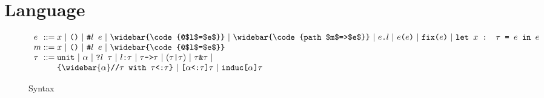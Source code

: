 \documentclass[acmsmall]{acmart}
\begin{document}

\section{Language}

\begin{figure*}[h]
\[
  \begin{array}{l @{} l}
    e 
    &{} ::=
    \begin{array}[t]{@{} l}
      \code{$x$}
      \ |\ 
      \code{()}
      \ |\ 
      \code{\#$l$ $e$} 
      \ |\ 
      \widebar{\code{@$l$=$e$}}
      \ |\ 
      \widebar{\code{path $m$=>$e$}} 
      \ |\ 
      \code{$e$.$l$}
      \ |\ 
      \code{$e$($e$)} 
      \ |\ 
      \code{fix($e$)}
      \ |\ 
      \code{let $x$ : $\tau$ = $e$ in $e$}
    \end{array}
    \\
    m 
    &{} ::=
    \begin{array}[t]{@{} l}
      \code{$x$}
      \ |\ 
      \code{()}
      \ |\ 
      \code{\#$l$ $e$} 
      \ |\ 
      \widebar{\code{@$l$=$e$}}
    \end{array}
    \\
    \tau
    &{} ::=
    \begin{array}[t]{@{} l}
      \code{unit} 
      \ |\ 
      \code{$\alpha$} 
      \ |\ 
      \code{?$l$ $\tau$} 
      \ |\ 
      \code{$l$:$\tau$} 
      \ |\ 
      \code{$\tau$->$\tau$} 
      \ |\ 
      (\code{$\tau$|$\tau$})
      \ |\ 
      \code{$\tau$\&$\tau$}
      \ |\ 
      \\
      \code{\{$\widebar{\alpha}$//$\tau$ with $\tau$<:$\tau$\}}
      \ |\ 
      \code{[$\alpha$<:$\tau$]$\tau$}
      \ |\ 
      \code{induc[$\alpha$]$\tau$}
    \end{array}
  \end{array}
\]

\caption{Syntax}
\end{figure*}
\end{document}
